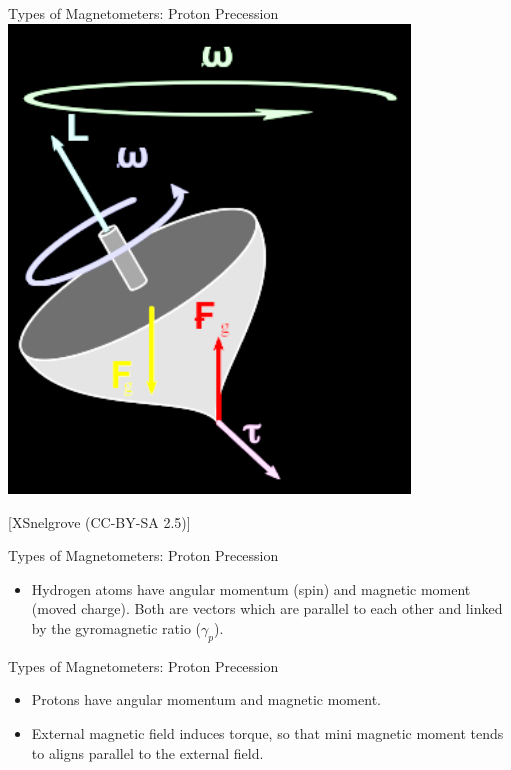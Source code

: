 \begin{frame}
  \begin{PointSix}{Types of Magnetometers: Proton Precession}
    \includegraphics[width=0.8\textwidth]{Figures/Magnetics/LamorPrecession_XSnelgrove.png}

    \tiny [XSnelgrove (CC-BY-SA 2.5)]
  \end{PointSix}
\end{frame}

\begin{frame}
  \begin{PointSix}{Types of Magnetometers: Proton Precession}
  \small
    \begin{itemize}
      \item Hydrogen atoms have angular momentum (spin) and magnetic moment (moved charge). Both are vectors which are parallel to each other and linked by the gyromagnetic ratio ($\gamma_p$).
    \end{itemize}
  \end{PointSix}
\end{frame}

\begin{frame}
  \begin{PointSix}{Types of Magnetometers: Proton Precession}
    \small
    \begin{itemize}
      \item Protons have angular momentum and magnetic moment.
      \item External magnetic field induces torque, so that mini magnetic moment tends to aligns parallel to the external field.
    \end{itemize}
  \end{PointSix}
\end{frame}

